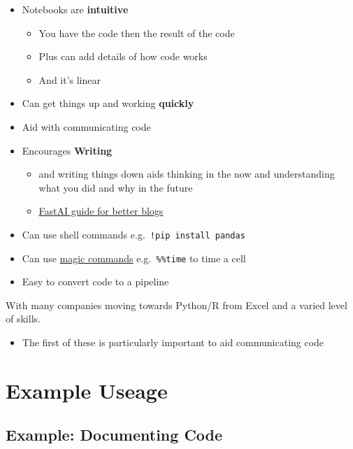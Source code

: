 \documentclass[
  letterpaper,
  DIV=11,
  numbers=noendperiod]{scrartcl}
\providecommand{\tightlist}{%
  \setlength{\itemsep}{0pt}\setlength{\parskip}{0pt}}\usepackage{longtable,booktabs,array}
\begin{document}
\begin{itemize}
\tightlist
\item
  Notebooks are \textbf{intuitive}

  \begin{itemize}
  \tightlist
  \item
    You have the code then the result of the code
  \item
    Plus can add details of how code works
  \item
    And it's linear
  \end{itemize}
\item
  Can get things up and working \textbf{quickly}
\item
  Aid with communicating code
\item
  Encourages \textbf{Writing}

  \begin{itemize}
  \tightlist
  \item
    and writing things down aids thinking in the now and understanding
    what you did and why in the future\\
  \item
    \href{https://www.fast.ai/posts/2019-05-13-blogging-advice.html}{FastAI
    guide for better blogs}
  \end{itemize}
\item
  Can use shell commands e.g.~\texttt{!pip\ install\ pandas}
\item
  Can use
  \href{https://ipython.readthedocs.io/en/stable/interactive/magics.html}{magic
  commands} e.g.~\texttt{\%\%time} to time a cell
\item
  Easy to convert code to a pipeline
\end{itemize}

With many companies moving towards Python/R from Excel and a varied
level of skills.

\begin{itemize}
\tightlist
\item
  The first of these is particularly important to aid communicating code
\end{itemize}

\hypertarget{example-useage}{%
\section{Example Useage}\label{example-useage}}

\hypertarget{example-documenting-code}{%
\subsection{Example: Documenting Code}\label{example-documenting-code}}
\end{document}
